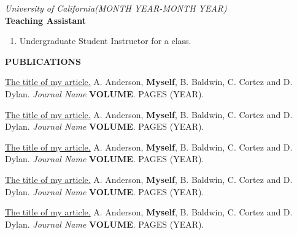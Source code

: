 \textit{University of California\hfill(MONTH YEAR-MONTH YEAR)}\\
\textbf{\rmfamily Teaching Assistant}
\begin{enumerate}
\item Undergraduate Student Instructor for a class.
\end{enumerate}


\textbf{PUBLICATIONS}

\rmfamily

{\color{blue} \ul{The title of my article.}} 
A. Anderson, \textbf{Myself}, B. Baldwin, C. Cortez and 
D. Dylan. \textit{Journal Name} \textbf{VOLUME}. PAGES (YEAR).

{\color{blue} \ul{The title of my article.}} 
A. Anderson, \textbf{Myself}, B. Baldwin, C. Cortez and 
D. Dylan. \textit{Journal Name} \textbf{VOLUME}. PAGES (YEAR).

{\color{blue} \ul{The title of my article.}} 
A. Anderson, \textbf{Myself}, B. Baldwin, C. Cortez and 
D. Dylan. \textit{Journal Name} \textbf{VOLUME}. PAGES (YEAR).

{\color{blue} \ul{The title of my article.}} 
A. Anderson, \textbf{Myself}, B. Baldwin, C. Cortez and 
D. Dylan. \textit{Journal Name} \textbf{VOLUME}. PAGES (YEAR).

{\color{blue} \ul{The title of my article.}} 
A. Anderson, \textbf{Myself}, B. Baldwin, C. Cortez and 
D. Dylan. \textit{Journal Name} \textbf{VOLUME}. PAGES (YEAR).
